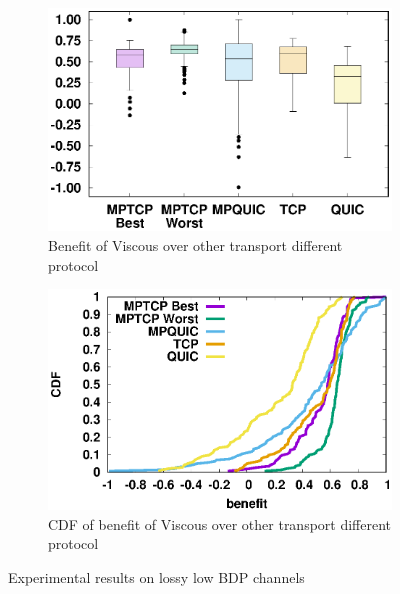 \begin{figure}
	\captionsetup[subfigure]{}
	\begin{center}
		\begin{subfigure}{.49\linewidth}
			\includegraphics[width=.95\linewidth]{img/lowbdp-lossy/lowbdplossy_benefit.eps}
		 \caption{\label{fig:benefit-box-lossy} Benefit of Viscous over other transport different protocol}
		\end{subfigure}
		\begin{subfigure}{.49\linewidth}
			\includegraphics[width=.95\linewidth]{img/lowbdp-lossy/lowbdplossy_cdf.eps}
		 \caption{\label{fig:benefit-cdf-lossy} CDF of benefit of Viscous over other transport different protocol}
		\end{subfigure}
		\caption{\label{fig:benefit-lossy}Experimental results on lossy low BDP channels}
	\end{center}
\end{figure}

